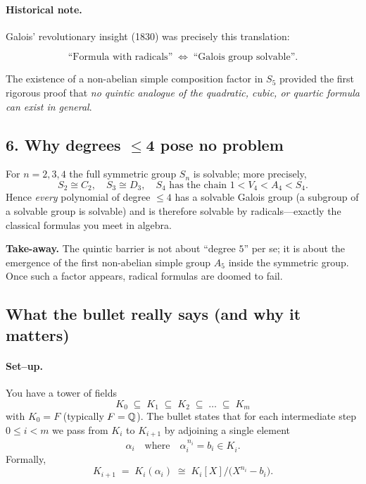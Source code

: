 \documentclass[12pt]{article}
\theoremstyle{definition} %
\theoremstyle{plain} %
\begin{document}
\paragraph{Historical note.}
Galois’ revolutionary insight (1830) was precisely this translation:

\[
   \text{``Formula with radicals''}\;
   \Longleftrightarrow\;
   \text{``Galois group solvable''}.
\]

The existence of a non-abelian simple composition factor in \(S_5\)
provided the first rigorous proof that \emph{no quintic analogue of the
quadratic, cubic, or quartic formula can exist in general}.

\subsection*{6.  Why degrees \(\boldsymbol{\le4}\) pose no problem}

For \(n=2,3,4\) the full symmetric group \(S_n\) is solvable; more
precisely,
\[
   S_2\cong C_2,\quad
   S_3\cong D_3,\quad
   S_4 \text{ has the chain }1<V_4<A_4<S_4.
\]
Hence \emph{every} polynomial of degree \(\le4\) has a solvable Galois
group (a subgroup of a solvable group is solvable) and is therefore
solvable by radicals—exactly the classical formulas you meet in
algebra.

\bigskip
\noindent
\textbf{Take-away.}\;
The quintic barrier is not about ``degree $5$'' per se; it is about the
emergence of the first non-abelian simple group \(A_5\) inside the
symmetric group.  Once such a factor appears, radical formulas are
doomed to fail.
\subsection*{What the bullet really says (and why it matters)}

\paragraph{Set--up.}
You have a tower of fields
\[
   K_0 \;\subseteq\; K_1 \;\subseteq\; K_2 \;\subseteq\; \dots \;\subseteq\; K_m
\]
with $K_0 = F$ (typically $F=\Bbb Q$).  
The bullet states that for each intermediate step $0\le i<m$ we pass
from $K_i$ to $K_{i+1}$ by adjoining a single element
\[
   \alpha_i
   \quad\text{where}\quad
   \alpha_i^{\,n_i}=b_i\in K_i^{\phantom{|}}.
\]
Formally,
\[
   K_{i+1} \;=\; K_i(\alpha_i) 
               \;\cong\;
               K_i[X]\Big/\bigl(X^{n_i}-b_i\bigr).
\]
\end{document}
